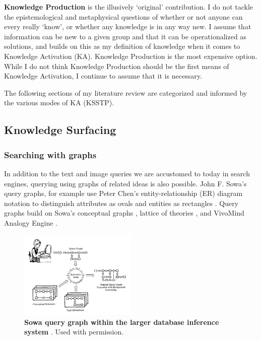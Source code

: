 \textbf{Knowledge Production} is the illusively ‘original’ contribution. I do not tackle the epistemological and metaphysical questions of whether or not anyone can every really ‘know’, or whether any knowledge is in any way new. I assume that information can be new to a given group and that it can be operationalized as solutions, and builds on this as my definition of knowledge when it comes to Knowledge Activation (KA). Knowledge Production is the most expensive option. While I do not think Knowledge Production should be the first means of Knowledge Activation, I continue to assume that it is necessary.

The following sections of my literature review are categorized and informed by the various modes of KA (KSSTP). 

\subsection{Knowledge Surfacing}
\subsubsection{Searching with graphs}
In addition to the text and image queries we are accustomed to today in search engines, querying using graphs of related ideas is also possible. John F. Sowa’s query graphs, for example \citep{sowa_conceptual_1984} use Peter Chen’s entity-relationship (ER) diagram notation to distinguish attributes as ovals and entities as rectangles \citep{chen_entity_1976,rodina_chen_2024}. Query graphs build on Sowa’s conceptual graphs \citep[p. 53]{sowa_semantics_2013}, lattice of theories \citep[p. 12]{john_f_sowa_dynamic_2007}, and VivoMind Analogy Engine \citep[p. 21-29]{sowa_analogical_2003}.

\FloatBarrier
\begin{figure}[h]
    \centering
    \includegraphics[width=0.5\textwidth]{figures/f10.png}
    \caption[Sowa query graph within the larger database inference system]{\textbf{Sowa query graph within the larger database inference system} \citep[p. 313]{sowa_conceptual_1984}. Used with permission.}
    \label{f10}
\end{figure}
\FloatBarrier


